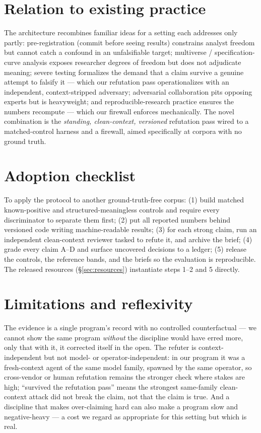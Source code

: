 \documentclass[11pt]{article}
\begin{document}
\section{Relation to existing practice}
\label{sec:related}
The architecture recombines familiar ideas for a setting each addresses only partly:
pre-registration \citep{nosek2018preregistration} (commit before seeing results) constrains
analyst freedom but cannot catch a confound in an unfalsifiable target; multiverse /
specification-curve analysis \citep{steegen2016multiverse,simonsohn2020specification} exposes
researcher degrees of freedom but does not adjudicate meaning; severe testing
\citep{mayo2018severe} formalizes the demand that a claim survive a genuine attempt to falsify
it --- which our refutation pass operationalizes with an independent, context-stripped adversary;
adversarial collaboration \citep{mellers2001adversarial} pits opposing experts but is heavyweight;
and reproducible-research practice \citep{sandve2013ten} ensures the numbers recompute --- which
our firewall enforces mechanically. The novel combination is the
\emph{standing, clean-context, versioned} refutation pass wired to a matched-control harness and
a firewall, aimed specifically at corpora with no ground truth.

\section{Adoption checklist}
\label{sec:adopt}
To apply the protocol to another ground-truth-free corpus: (1) build matched
known-positive and structured-meaningless controls and require every discriminator to separate
them first; (2) put all reported numbers behind versioned code writing machine-readable results;
(3) for each strong claim, run an independent clean-context reviewer tasked to refute it, and
archive the brief; (4) grade every claim A--D and surface uncovered decisions to a ledger; (5)
release the controls, the reference bands, and the briefs so the evaluation is reproducible. The
released resources (\S\ref{sec:resources}) instantiate steps 1--2 and 5 directly.

\section{Limitations and reflexivity}
\label{sec:limits}
The evidence is a single program's record with no controlled counterfactual --- we cannot show the
same program \emph{without} the discipline would have erred more, only that with it, it corrected
itself in the open. The refuter is context-independent but not model- or operator-independent: in
our program it was a fresh-context agent of the same model family, spawned by the same operator,
so cross-vendor or human refutation remains the stronger check where stakes are high; ``survived
the refutation pass'' means the strongest same-family clean-context attack did not break the
claim, not that the claim is true. And a discipline that makes over-claiming hard can also make a
program slow and negative-heavy --- a cost we regard as appropriate for this setting but which is
real.
\end{document}
